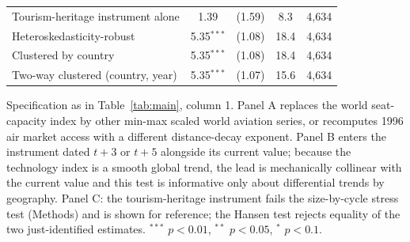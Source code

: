 \begin{table}[htbp]
\begin{threeparttable}
\begin{tabular}{lcccc}
  Tourism-heritage instrument alone & 1.39 & (1.59) & 8.3 & 4,634 \\
  Heteroskedasticity-robust & 5.35$^{***}$ & (1.08) & 18.4 & 4,634 \\
  Clustered by country & 5.35$^{***}$ & (1.08) & 18.4 & 4,634 \\
  Two-way clustered (country, year) & 5.35$^{***}$ & (1.07) & 15.6 & 4,634 \\
\bottomrule
\end{tabular}
\begin{tablenotes}\scriptsize
\item Specification as in Table~\ref{tab:main}, column 1. Panel A replaces the world seat-capacity index by other min-max scaled world aviation series, or recomputes 1996 air market access with a different distance-decay exponent. Panel B enters the instrument dated $t+3$ or $t+5$ alongside its current value; because the technology index is a smooth global trend, the lead is mechanically collinear with the current value and this test is informative only about differential trends by geography. Panel C: the tourism-heritage instrument fails the size-by-cycle stress test (Methods) and is shown for reference; the Hansen test rejects equality of the two just-identified estimates. $^{***}$ $p<0.01$, $^{**}$ $p<0.05$, $^{*}$ $p<0.1$.
\end{tablenotes}
\end{threeparttable}
\end{table}
